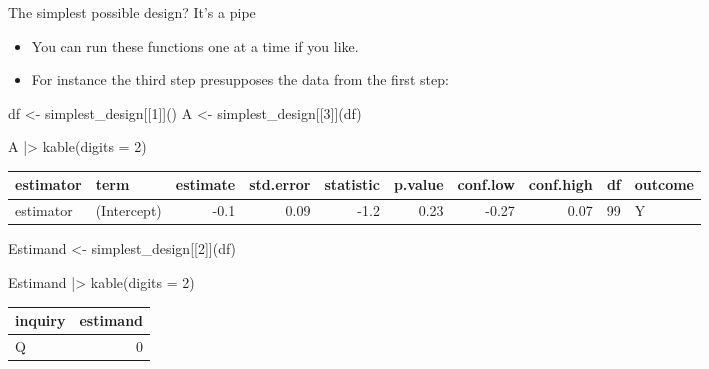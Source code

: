 \documentclass[
  11pt,
  ignorenonframetext,
]{beamer}
\newenvironment{Shaded}{\begin{snugshade}}{\end{snugshade}}
\newcommand{\AttributeTok}[1]{\textcolor[rgb]{0.40,0.45,0.13}{#1}}
\newcommand{\DecValTok}[1]{\textcolor[rgb]{0.68,0.00,0.00}{#1}}
\newcommand{\FunctionTok}[1]{\textcolor[rgb]{0.28,0.35,0.67}{#1}}
\newcommand{\NormalTok}[1]{\textcolor[rgb]{0.00,0.23,0.31}{#1}}
\newcommand{\OtherTok}[1]{\textcolor[rgb]{0.00,0.23,0.31}{#1}}
\newcommand{\SpecialCharTok}[1]{\textcolor[rgb]{0.37,0.37,0.37}{#1}}
\providecommand{\tightlist}{%
  \setlength{\itemsep}{0pt}\setlength{\parskip}{0pt}}\usepackage{longtable,booktabs,array}
\begin{document}
\begin{frame}[fragile]{The simplest possible design? It's a pipe}
\protect\hypertarget{the-simplest-possible-design-its-a-pipe-1}{}
\begin{itemize}
\tightlist
\item
  You can run these functions one at a time if you like.
\item
  For instance the third step presupposes the data from the first step:
\end{itemize}

\begin{Shaded}
\begin{Highlighting}[]
\NormalTok{df }\OtherTok{\textless{}{-}}\NormalTok{ simplest\_design[[}\DecValTok{1}\NormalTok{]]()}
\NormalTok{A  }\OtherTok{\textless{}{-}}\NormalTok{ simplest\_design[[}\DecValTok{3}\NormalTok{]](df)}

\NormalTok{A }\SpecialCharTok{|\textgreater{}} \FunctionTok{kable}\NormalTok{(}\AttributeTok{digits =} \DecValTok{2}\NormalTok{)}
\end{Highlighting}
\end{Shaded}

\begin{tabular}{l|l|r|r|r|r|r|r|r|l}
\hline
estimator & term & estimate & std.error & statistic & p.value & conf.low & conf.high & df & outcome\\
\hline
estimator & (Intercept) & -0.1 & 0.09 & -1.2 & 0.23 & -0.27 & 0.07 & 99 & Y\\
\hline
\end{tabular}

\begin{Shaded}
\begin{Highlighting}[]
\NormalTok{Estimand  }\OtherTok{\textless{}{-}}\NormalTok{ simplest\_design[[}\DecValTok{2}\NormalTok{]](df)}

\NormalTok{Estimand }\SpecialCharTok{|\textgreater{}} \FunctionTok{kable}\NormalTok{(}\AttributeTok{digits =} \DecValTok{2}\NormalTok{)}
\end{Highlighting}
\end{Shaded}

\begin{tabular}{l|r}
\hline
inquiry & estimand\\
\hline
Q & 0\\
\hline
\end{tabular}
\end{frame}
\end{document}
